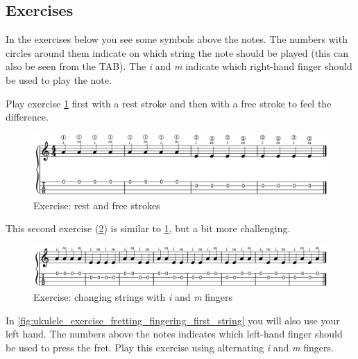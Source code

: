 \newpage

\subsection{Exercises}

In the exercises below you see some symbols above the notes. The numbers with circles around them indicate on which string the note should be played (this can also be seen from the TAB). The \textit{i} and \textit{m} indicate which right-hand finger should be used to play the note.

Play exercise \ref{fig:ukulele_exercise_rest_free_stroke} first with a rest stroke and then with a free stroke to feel the difference.

\begin{figure}[h]
    \centering
    \includegraphics[width=\textwidth]{../../MuseScore/Ukulele/UkuleleExerciseFreeAndRestStokeSimple.png}
    \caption{Exercise: rest and free strokes}
    \label{fig:ukulele_exercise_rest_free_stroke}
\end{figure}

This second exercise (\ref{fig:ukulele_exercise_i_m_string_change}) is similar to \ref{fig:ukulele_exercise_rest_free_stroke}, but a bit more challenging.

\begin{figure}[h]
    \centering
    \includegraphics[width=\textwidth]{../../MuseScore/Ukulele/UkuleleExerciseFreeAndRestStokeStepTwo.png}
    \caption{Exercise: changing strings with \textit{i} and \textit{m} fingers}
    \label{fig:ukulele_exercise_i_m_string_change}
\end{figure}

\newpage

In \ref{fig:ukulele_exercise_fretting_fingering_first_string} you will also use your left hand. The numbers above the notes indicates which left-hand finger should be used to press the fret. Play this exercise using alternating \textit{i} and \textit{m} fingers. 

